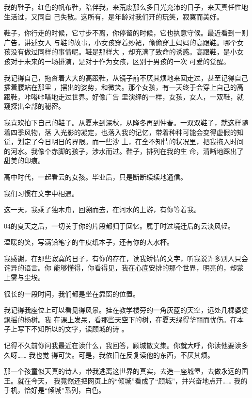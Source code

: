 \documentclass[12pt,a4paper]{article}
\begin{document}
		我的鞋子，红色的帆布鞋，陪伴我，来荒废那么多日光充沛的日子，来天真任性地生活过，又同自
	己失散。这所有，是年龄对我们开的玩笑，寂寞而美好。

		鞋子，你行走的时候，它寸步不离，你停留的时候，它也执意守候。最近看到一则广告，讲述女人
	与鞋的故事，小女孩穿着纱裙，偷偷穿上妈妈的高跟鞋。哪个女孩没有做过同样的事情呢。鞋是那样大
	，却充满了致命的诱惑。高跟鞋，是小女孩对于未来的一场排演，是对于作为女孩，区别于男孩的一次
	可爱的觉醒。

		我记得自己，拖沓着大大的高跟鞋，从镜子前不厌其烦地来回走过，甚至记得自己插着腰站在那里
	，摆出的姿势，和微笑。那个女孩，有一天终于会穿上自己的高跟鞋，咔嗒咔嗒地走过世界。好像广告
	里演绎的一样，女孩，女人，一双鞋，就窥探出全部的秘密。

		我喜欢拍下自己的鞋子。从夏末到深秋，从隆冬再到仲春。一双双鞋子，就这样随着四季风物，落
	入光影的凝定，也落入我的记忆，带着种种可能会变得虚假的知觉，划定了今日明日的界限。而一些沙
	土，在全不知情的状况里，把我拖入时间的河水。我像个赤脚的孩子，涉水而过。鞋子，排列在我的生
	命，清晰地踩出了甜美的印痕。

	\endwriting



		高中时代，一起看云的女孩。毕业后，只是断断续续地通信。

		我们习惯在文字中相遇。

		这一天，我乘了独木舟，回溯而去，在河水的上游，有你等着我。

		04的夏天之后，一切关于你的片段都归于回忆。属于时过境迁后的云淡风轻。

		温暖的笑，写满铅笔字的牛皮纸本子，还有你的大水杯。

		我感谢，在那些寂寞的日子，有你的存在，读我矫情的文字，听我说许多别人只会诧异的语言。你
	能够懂得，你看得见，我在心底安排的那个世界，明亮的，却蒙上雾与尘埃。


		很长的一段时间，我们都是坐在靠窗的位置。

		我记得我座位上可以看见得风景。挂在教学楼旁的一角灰蓝的天空，远处几棵婆娑飘摇的杨树。我
	在课上发呆，看那些天空下的树，在夏天绿得华丽而忧伤。在本子上写下不知所以的文字，读顾城的诗
	。

		记得不久前你问我最近在读什么，我回答，顾城散文集。你就大呼，你读他要读多久呀…… 我也觉
	得可笑。可是，我依旧在反复读他的东西，不厌其烦。

		那一个孩童似天真的诗人，带我逃离这世界的真实，去造一座城堡，去做永远的国王。就在今天，
	我竟然还把网页上的“倾城”看成了“顾城”，并兴奋地点开…… 我的手机，恰好是“倾城”系列，白色。
\end{document}
